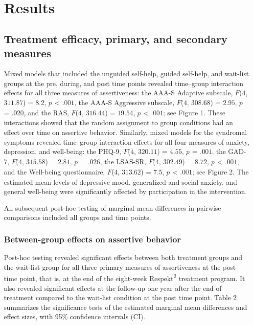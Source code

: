 \documentclass[preprint,
3p]{elsarticle} %
\begin{document}
\hypertarget{results}{%
\section{Results}\label{results}}

\hypertarget{treatment-efficacy-primary-and-secondary-measures}{%
\subsection{Treatment efficacy, primary, and secondary
measures}\label{treatment-efficacy-primary-and-secondary-measures}}

Mixed models that included the unguided self-help, guided self-help, and
wait-list groups at the pre, during, and post time points revealed
time--group interaction effects for all three measures of assertiveness:
the AAA-S Adaptive subscale, \(F\)(\(4\), \(311.87\)) = \(8.2\),
\(p_{ }\) \textless{} \(.001\), the AAA-S Aggressive subscale,
\(F\)(\(4\), \(308.68\)) = \(2.95\), \(p_{ }\) = \(.020\), and the RAS,
\(F\)(\(4\), \(316.44\)) = \(19.54\), \(p_{ }\) \textless{} \(.001\);
see Figure 1. These interactions showed that the random assignment to
group conditions had an effect over time on assertive behavior.
Similarly, mixed models for the syndromal symptoms revealed time--group
interaction effects for all four measures of anxiety, depression, and
well-being: the PHQ-9, \(F\)(\(4\), \(320.11\)) = \(4.55\), \(p_{ }\) =
\(.001\), the GAD-7, \(F\)(\(4\), \(315.58\)) = \(2.81\), \(p_{ }\) =
\(.026\), the LSAS-SR, \(F\)(\(4\), \(302.49\)) = \(8.72\), \(p_{ }\)
\textless{} \(.001\), and the Well-being questionnaire, \(F\)(\(4\),
\(313.62\)) = \(7.5\), \(p_{ }\) \textless{} \(.001\); see Figure 2. The
estimated mean levels of depressive mood, generalized and social
anxiety, and general well-being were significantly affected by
participation in the intervention.

All subsequent post-hoc testing of marginal mean differences in pairwise
comparisons included all groups and time points.

\hypertarget{between-group-effects-on-assertive-behavior}{%
\subsubsection{Between-group effects on assertive
behavior}\label{between-group-effects-on-assertive-behavior}}

Post-hoc testing revealed significant effects between both treatment
groups and the wait-list group for all three primary measures of
assertiveness at the post time point, that is, at the end of the
eight-week Respekt\textsuperscript{2} treatment program. It also
revealed significant effects at the follow-up one year after the end of
treatment compared to the wait-list condition at the post time point.
Table 2 summarizes the significance tests of the estimated marginal mean
differences and effect sizes, with 95\% confidence intervals (CI).
\end{document}
